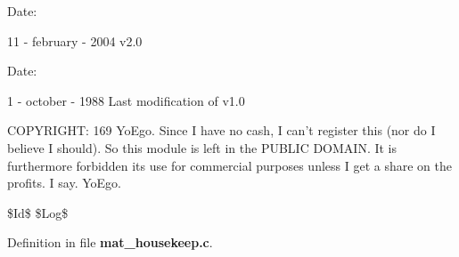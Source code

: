 \begin{Desc}
\item[Date: ]\par
11 - february - 2004 v2.0\end{Desc}
\begin{Desc}
\item[Date: ]\par
1 - october - 1988 Last modification of v1.0\end{Desc}
COPYRIGHT: 169 Yo\-Ego. Since I have no cash, I can't register this (nor do I believe I should). So this module is left in the PUBLIC DOMAIN. It is furthermore forbidden its use for commercial purposes unless I get a share on the profits. I say. Yo\-Ego.

\$Id\$ \$Log\$



Definition in file {\bf mat\_\-housekeep.c}.